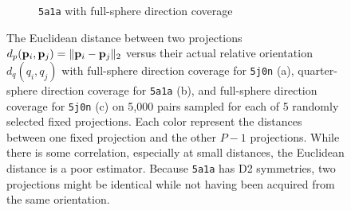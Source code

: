 \begin{figure}[ht!]
\begin{minipage}[t]{0.99\linewidth}
\begin{subfigure}[t]{0.31\textwidth}
            \caption{\texttt{5a1a} with full-sphere direction coverage}\label{fig:euclidean-not-robust:5a1a}
        \end{subfigure}
        \caption{%
            The Euclidean distance between two projections $d_p(\mathbf{p}_i, \mathbf{p}_j) = \Vert \mathbf{p}_i - \mathbf{p}_j \Vert_2$ versus their actual relative orientation $d_q(q_i, q_j)$ with full-sphere direction coverage for \texttt{5j0n} (a), quarter-sphere direction coverage for \texttt{5a1a} (b), and full-sphere direction coverage for \texttt{5j0n} (c) on 5,000 pairs sampled for each of 5 randomly selected fixed projections.
            Each color represent the distances between one fixed projection and the other $P-1$ projections.
            While there is some correlation, especially at small distances, the Euclidean distance is a poor estimator.
            Because \texttt{5a1a} has D2 symmetries, two projections might be identical while not having been acquired from the same orientation.
        }\label{fig:euclidean-not-robust}
    \end{minipage}
\end{figure}




